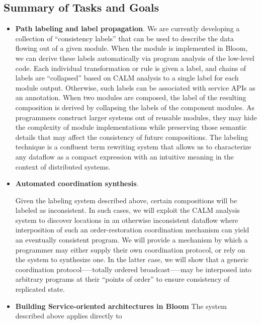 \subsection{Summary of Tasks and Goals}



\begin{itemize}
\item \textbf{Path labeling and label propagation}.
We are currently developing a collection of ``consistency labels'' that 
can be used to describe the data flowing out of a given module.  When the module
is implemented in Bloom, we can derive these labels automatically via program
analysis of the low-level code.  Each individual transformation or rule is 
given a label, and chains of labels are ``collapsed'' based on CALM analysis to 
a single label for each module output.  
Otherwise, such labels can be associated with service APIs as an annotation.  
When two modules are composed, the label of the resulting composition is derived
by collapsing the labels of the component modules.
As programmers construct larger systems out of reusable modules, they may 
hide the complexity of module implementations while preserving those semantic 
details that may affect the consistency of future compositions. The 
labeling technique is a confluent term rewriting system that allows us to 
characterize any dataflow as a compact expression with an intuitive 
meaning in the context of distributed systems.

\item \textbf{Automated coordination synthesis}.

Given the labeling system described above, certain compositions will be 
labeled as inconsistent.  In such cases, we will exploit the CALM
analysis system to discover locations in an otherwise 
inconsistent dataflow where interposition of such an order-restoration 
coordination mechanism can yield an eventually consistent program.
We will provide a mechanism by which a programmer may either supply 
their own coordination protocol, or rely on the system to synthesize one. 
In the latter case, we will show that a generic coordination 
protocol—--totally ordered broadcast--—may be interposed into arbitrary 
programs at their ``points of order''
to ensure consistency of replicated state.

\item \textbf{Building Service-oriented architectures in Bloom}
The system described above applies directly to 
\end{itemize}

